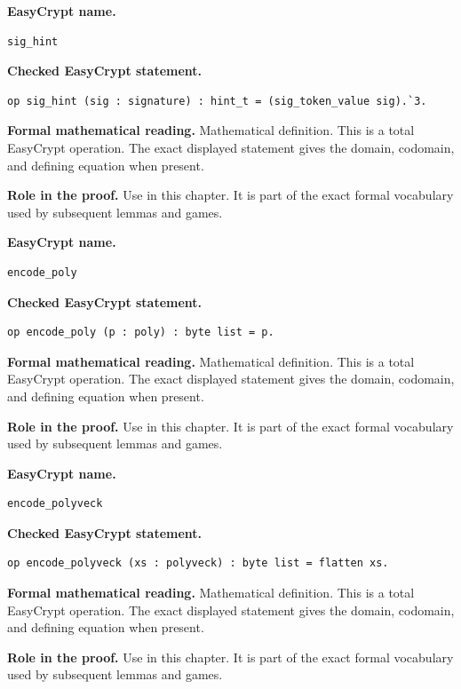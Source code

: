 \begin{formaldefinition}
\noindent\textbf{EasyCrypt name.}
\begin{lstlisting}[language=EasyCrypt,basicstyle=\ttfamily\scriptsize]
sig_hint
\end{lstlisting}
\noindent\textbf{Checked EasyCrypt statement.}
\begin{lstlisting}[language=EasyCrypt,basicstyle=\ttfamily\scriptsize]
op sig_hint (sig : signature) : hint_t = (sig_token_value sig).`3.
\end{lstlisting}
\noindent\textbf{Formal mathematical reading.}
Mathematical definition. This is a total EasyCrypt operation.  The exact displayed statement gives the domain, codomain, and defining equation when present.

\noindent\textbf{Role in the proof.}
Use in this chapter. It is part of the exact formal vocabulary used by subsequent lemmas and games.

\end{formaldefinition}

\begin{formaldefinition}
\noindent\textbf{EasyCrypt name.}
\begin{lstlisting}[language=EasyCrypt,basicstyle=\ttfamily\scriptsize]
encode_poly
\end{lstlisting}
\noindent\textbf{Checked EasyCrypt statement.}
\begin{lstlisting}[language=EasyCrypt,basicstyle=\ttfamily\scriptsize]
op encode_poly (p : poly) : byte list = p.
\end{lstlisting}
\noindent\textbf{Formal mathematical reading.}
Mathematical definition. This is a total EasyCrypt operation.  The exact displayed statement gives the domain, codomain, and defining equation when present.

\noindent\textbf{Role in the proof.}
Use in this chapter. It is part of the exact formal vocabulary used by subsequent lemmas and games.

\end{formaldefinition}

\begin{formaldefinition}
\noindent\textbf{EasyCrypt name.}
\begin{lstlisting}[language=EasyCrypt,basicstyle=\ttfamily\scriptsize]
encode_polyveck
\end{lstlisting}
\noindent\textbf{Checked EasyCrypt statement.}
\begin{lstlisting}[language=EasyCrypt,basicstyle=\ttfamily\scriptsize]
op encode_polyveck (xs : polyveck) : byte list = flatten xs.
\end{lstlisting}
\noindent\textbf{Formal mathematical reading.}
Mathematical definition. This is a total EasyCrypt operation.  The exact displayed statement gives the domain, codomain, and defining equation when present.

\noindent\textbf{Role in the proof.}
Use in this chapter. It is part of the exact formal vocabulary used by subsequent lemmas and games.

\end{formaldefinition}

